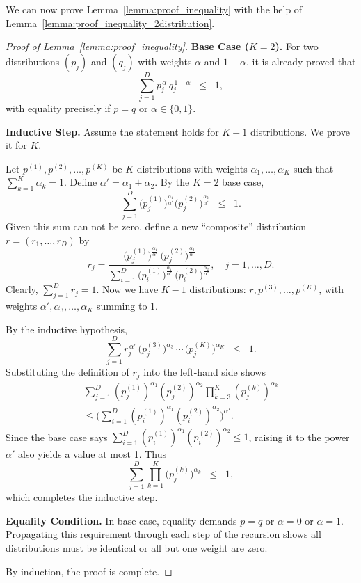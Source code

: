 \documentclass[11pt]{article}
\begin{document}
We can now prove Lemma~\ref{lemma:proof_inequality} with the help of Lemma~\ref{lemma:proof_inequality_2distribution}.
\begin{proof}[Proof of Lemma~\ref{lemma:proof_inequality}]

\textbf{Base Case ($K=2$).} 
For two distributions $(p_j)$ and $(q_j)$ with weights $\alpha$ and $1-\alpha$, 
it is already proved that
\[
\sum_{j=1}^D p_j^{\,\alpha} \, q_j^{\,1-\alpha} \;\;\le\;\; 1,
\]
with equality precisely if $p=q$ or $\alpha \in \{0,1\}$.

\textbf{Inductive Step.} 
Assume the statement holds for $K-1$ distributions. We prove it for $K$.

Let $p^{(1)}, p^{(2)}, \dots, p^{(K)}$ be $K$ distributions with weights 
$\alpha_1,\dots,\alpha_K$ such that $\sum_{k=1}^K \alpha_k = 1$. 
Define $\alpha' = \alpha_1 + \alpha_2$. 
By the $K=2$ base case,
\[
\sum_{j=1}^D 
\bigl(p^{(1)}_j\bigr)^{\frac{\alpha_1}{\alpha'}}
\bigl(p^{(2)}_j\bigr)^{\frac{\alpha_2}{\alpha'}}
\;\;\le\;\; 1.
\]
Given this sum can not be zero, define a new ``composite'' distribution 
$r = (r_1,\dots,r_D)$ by
\[
r_j 
= 
\frac{
 \bigl(p^{(1)}_j\bigr)^{\frac{\alpha_1}{\alpha'}}\,\bigl(p^{(2)}_j\bigr)^{\frac{\alpha_2}{\alpha'}}
}{
 \sum_{i=1}^D 
 \bigl(p^{(1)}_i\bigr)^{\frac{\alpha_1}{\alpha'}}\,\bigl(p^{(2)}_i\bigr)^{\frac{\alpha_2}{\alpha'}}
},
\quad
j=1,\dots,D.
\]
Clearly, $\sum_{j=1}^D r_j = 1$. 
Now we have $K-1$ distributions: $r, p^{(3)}, \dots, p^{(K)}$, 
with weights $\alpha',\alpha_3,\dots,\alpha_K$ summing to 1.

By the inductive hypothesis, 
\[
\sum_{j=1}^D
r_j^{\,\alpha'}
\,\bigl(p^{(3)}_j\bigr)^{\alpha_3}
\,\cdots\,
\bigl(p^{(K)}_j\bigr)^{\alpha_K}
\;\;\le\;\; 1.
\]
Substituting the definition of $r_j$ into the left-hand side shows
\begin{multline}
\sum_{j=1}^D
  (p^{(1)}_j)^{\alpha_1}(p^{(2)}_j)^{\alpha_2}
  \prod_{k=3}^K (p^{(k)}_j)^{\alpha_k} \\
\le
\Biggl(
  \sum_{i=1}^D
    (p^{(1)}_i)^{\alpha_1}(p^{(2)}_i)^{\alpha_2}
\Biggr)^{\alpha'}.
\end{multline}
Since the base case says $\sum_{i=1}^D (p^{(1)}_i)^{\alpha_1} (p^{(2)}_i)^{\alpha_2} 
\le 1$, 
raising it to the power $\alpha'$ also yields a value at most 1. Thus
\[
\sum_{j=1}^D
\prod_{k=1}^K \bigl(p^{(k)}_j\bigr)^{\alpha_k}
\;\;\le\;\; 1,
\]
which completes the inductive step.

\textbf{Equality Condition.} 
In base case, equality demands $p=q$ or 
$\alpha=0 $ or $\alpha = 1$. Propagating this requirement through 
each step of the recursion shows all distributions must be identical 
or all but one weight are zero. 

By induction, the proof is complete.
\end{proof}
\end{document}
